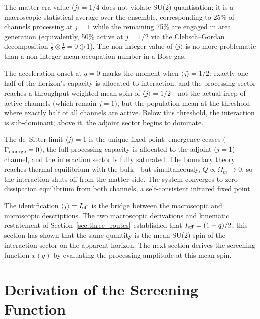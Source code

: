 \documentclass[aps,prd,twocolumn,10pt,superscriptaddress,nofootinbib]{revtex4-2}
\begin{document}
The matter-era value $\langle j \rangle = 1/4$ does not violate
SU(2) quantisation: it is a macroscopic statistical average over
the ensemble, corresponding to 25\% of channels processing at
$j = 1$ while the remaining 75\% are engaged in area generation
(equivalently, 50\% active at $j = 1/2$ via the Clebsch--Gordan
decomposition
$\tfrac{1}{2} \otimes \tfrac{1}{2} = 0 \oplus 1$).  The
non-integer value of $\langle j \rangle$ is no more problematic
than a non-integer mean occupation number in a Bose gas.

The acceleration onset at $q = 0$ marks the moment when
$\langle j \rangle = 1/2$: exactly one-half of the horizon's
capacity is allocated to interaction, and the processing sector
reaches a throughput-weighted mean spin of $\langle j\rangle = 1/2$---not
the actual irrep of active channels (which remain $j=1$), but the
population mean at the threshold where exactly half of all channels
are active.  Below this threshold, the interaction is sub-dominant;
above it, the adjoint sector begins to dominate.

The de~Sitter limit $\langle j \rangle = 1$ is the unique fixed
point: emergence ceases ($\Gamma_{\rm emerge} = 0$), the full
processing capacity is allocated to the adjoint ($j = 1$) channel,
and the interaction sector is fully saturated.  The boundary theory
reaches thermal equilibrium with the bulk---but simultaneously,
$Q \propto \Omega_m \to 0$, so the interaction shuts off from
the matter side.  The system converges to zero-dissipation
equilibrium from both channels, a self-consistent infrared
fixed point.

The identification $\langle j \rangle = I_{\rm eff}$ is the
bridge between the macroscopic and microscopic descriptions.
The two macroscopic derivations and kinematic restatement of Section~\ref{sec:three_routes}
established that $I_{\rm eff} = (1-q)/2$; this section has shown
that the same quantity is the mean SU(2) spin of the interaction
sector on the apparent horizon.  The next section derives the
screening function $x(q)$ by evaluating the processing amplitude
at this mean spin.


\section{Derivation of the Screening Function}
\label{sec:derivation}
\end{document}
